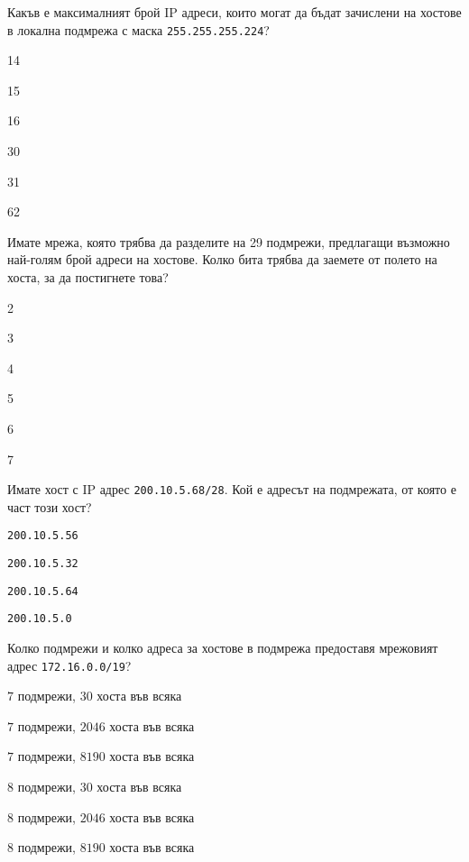 \begin{q}
  Какъв е максималният брой IP адреси, които могат да бъдат зачислени на хостове
  в локална подмрежа с маска \texttt{255.255.255.224}?
  \begin{defractors}
  \item 14
  \item 15
  \item 16
  \item 30
  \item 31
  \item 62
  \end{defractors}
\end{q}

\begin{q}
  Имате мрежа, която трябва да разделите на 29 подмрежи, предлагащи възможно
  най-голям брой адреси на хостове. Колко бита трябва да заемете от полето на
  хоста, за да постигнете това?
  \begin{defractors}
  \item 2
  \item 3
  \item 4
  \item 5
  \item 6
  \item 7
  \end{defractors}
\end{q}

\begin{q}
  Имате хост с IP адрес \texttt{200.10.5.68/28}. Кой е адресът на подмрежата, от
  която е част този хост?
  \begin{defractors}
  \item \texttt{200.10.5.56}
  \item \texttt{200.10.5.32}
  \item \texttt{200.10.5.64}
  \item \texttt{200.10.5.0}
  \end{defractors}
\end{q}

\begin{q}
  Колко подмрежи и колко адреса за хостове в подмрежа предоставя мрежовият адрес
  \texttt{172.16.0.0/19}?
  \begin{defractors}
  \item $7$ подмрежи, $30$ хоста във всяка
  \item $7$ подмрежи, $2046$ хоста във всяка
  \item $7$ подмрежи, $8190$ хоста във всяка
  \item $8$ подмрежи, $30$ хоста във всяка
  \item $8$ подмрежи, $2046$ хоста във всяка
  \item $8$ подмрежи, $8190$ хоста във всяка
  \end{defractors}
\end{q}

